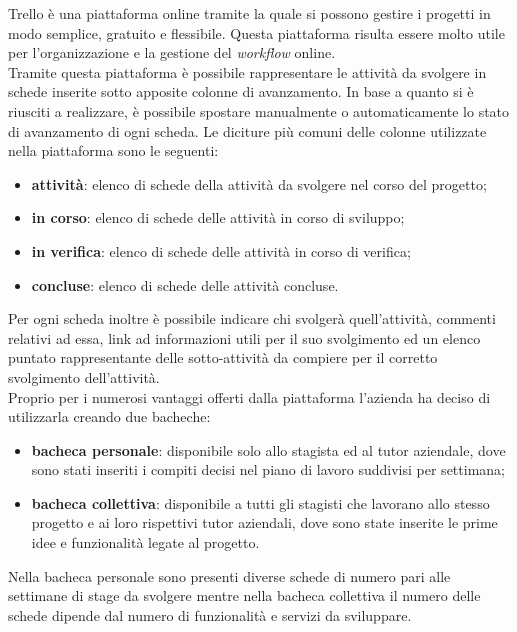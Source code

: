Trello è una piattaforma online tramite la quale si possono gestire i progetti in modo semplice, gratuito e flessibile. Questa piattaforma risulta essere molto utile per l'organizzazione e la gestione del \textit{workflow} online.\\
Tramite questa piattaforma è possibile rappresentare le attività da svolgere in schede inserite sotto apposite colonne di avanzamento. In base a quanto si è riusciti a realizzare, è possibile spostare manualmente o automaticamente lo stato di avanzamento di ogni scheda. Le diciture più comuni delle colonne utilizzate nella piattaforma sono le seguenti:
\begin{itemize}
	\item \textbf{attività}: elenco di schede della attività da svolgere nel corso del progetto;
	\item \textbf{in corso}: elenco di schede delle attività in corso di sviluppo;
	\item \textbf{in verifica}: elenco di schede delle attività in corso di verifica;
	\item \textbf{concluse}: elenco di schede delle attività concluse.
\end{itemize}
Per ogni scheda inoltre è possibile indicare chi svolgerà quell'attività, commenti relativi ad essa, link ad informazioni utili per il suo svolgimento ed un elenco puntato rappresentante delle sotto-attività da compiere per il corretto svolgimento dell'attività.\\
Proprio per i numerosi vantaggi offerti dalla piattaforma l'azienda ha deciso di utilizzarla creando due bacheche:
\begin{itemize}
	\item \textbf{bacheca personale}: disponibile solo allo stagista ed al tutor aziendale, dove sono stati inseriti i compiti decisi nel piano di lavoro suddivisi per settimana;
	\item\textbf{bacheca collettiva}: disponibile a tutti gli stagisti che lavorano allo stesso progetto e ai loro rispettivi tutor aziendali, dove sono state inserite le prime idee e funzionalità legate al progetto.
\end{itemize}
Nella bacheca personale sono presenti diverse schede di numero pari alle settimane di stage da svolgere mentre nella bacheca collettiva il numero delle schede dipende dal numero di funzionalità e servizi da sviluppare. 

